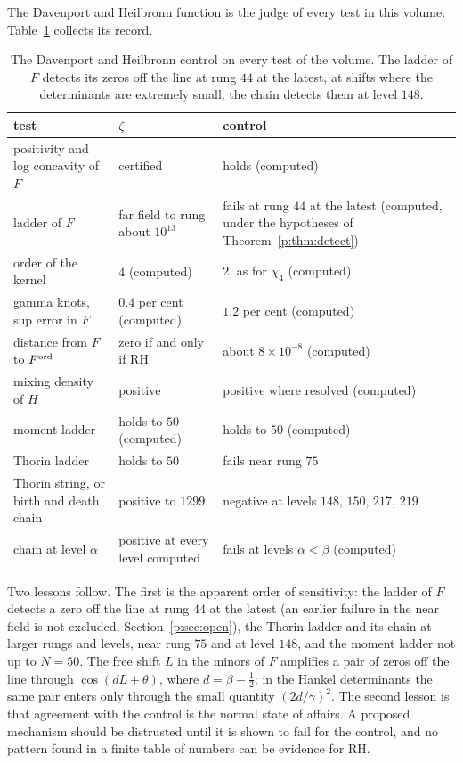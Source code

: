The Davenport and Heilbronn function is the judge of every test in this volume. Table~\ref{tab:control} collects its record.

\begin{table}[t]
\centering
\footnotesize
\begin{tabular}{p{}p{}p{}}
\toprule
test & $\zeta$ & control\\
\midrule
positivity and log concavity of $F$ & certified & holds (computed)\\
ladder of $F$ & far field to rung about $10^{13}$ & fails at rung $44$ at the latest (computed, under the hypotheses of Theorem~\ref{p:thm:detect})\\
order of the kernel & $4$ (computed) & $2$, as for $\chi_4$ (computed)\\
gamma knots, sup error in $F$ & $0.4$ per cent (computed) & $1.2$ per cent (computed)\\
distance from $F$ to $F^{\rm ord}$ & zero if and only if RH & about $8\times10^{-8}$ (computed)\\
mixing density of $H$ & positive & positive where resolved (computed)\\
moment ladder & holds to $50$ (computed) & holds to $50$ (computed)\\
Thorin ladder & holds to $50$ & fails near rung $75$\\
Thorin string, or birth and death chain & positive to $1299$ & negative at levels $148$, $150$, $217$, $219$\\
chain at level $\alpha$ & positive at every level computed & fails at levels $\alpha<\beta$ (computed)\\
\bottomrule
\end{tabular}
\caption{The Davenport and Heilbronn control on every test of the volume. The ladder of $F$ detects its zeros off the line at rung $44$ at the latest, at shifts where the determinants are extremely small; the chain detects them at level $148$.}
\label{tab:control}
\end{table}

Two lessons follow. The first is the apparent order of sensitivity: the ladder of $F$ detects a zero off the line at rung $44$ at the latest (an earlier failure in the near field is not excluded, Section~\ref{p:sec:open}), the Thorin ladder and its chain at larger rungs and levels, near rung $75$ and at level $148$, and the moment ladder not up to $N=50$. The free shift $L$ in the minors of $F$ amplifies a pair of zeros off the line through $\cos(dL+\theta)$, where $d=\beta-\frac12$; in the Hankel determinants the same pair enters only through the small quantity $(2d/\gamma)^2$. The second lesson is that agreement with the control is the normal state of affairs. A proposed mechanism should be distrusted until it is shown to fail for the control, and no pattern found in a finite table of numbers can be evidence for RH.

